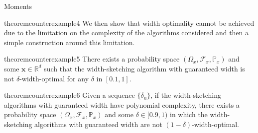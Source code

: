 \begin{assumptioni}[i.i.d data]
\begin{assumptioni}
\begin{assumptioni}{Moments}
\begin{restatable}{theorem}{counterexample4}
We then show that width optimality cannot be achieved due to the limitation on the complexity of the algorithms considered and then a simple construction around this limitation.
\begin{restatable}{theorem}{counterexample5}\label{prop:counterexample5}
  There exists a probability space $(\Omega_x, \mathcal{F}_x,\mathbb{P}_x)$ and some $\bm{x} \in \mathbb{R}^d$ such that the width-sketching algorithm with guaranteed width is not $\delta$-width-optimal for any $\delta$ in $[0.1,1]$. 
\end{restatable}

\begin{restatable}{theorem}{counterexample6}\label{prop:counterexample6}
  Given a sequence $\{\delta_n\}$, if the width-sketching algorithms with guaranteed width have polynomial complexity, there exists a probability space $(\Omega_x, \mathcal{F}_x,\mathbb{P}_x)$ and some $\delta \in [0.9,1)$ in which the width-sketching algorithms with guaranteed width are not $(1 - \delta)$-width-optimal. 
\end{restatable}


\end{restatable}
\end{assumptioni}
\end{assumptioni}
\end{assumptioni}
